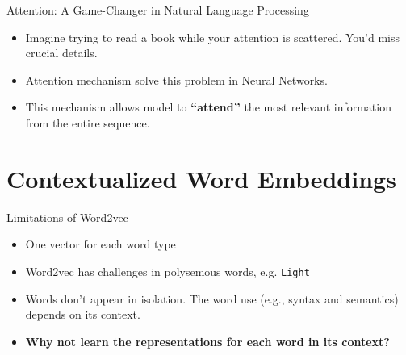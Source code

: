 \documentclass[serif, aspectratio=169]{beamer}
\begin{document}
\begin{frame}{Attention: A Game-Changer in Natural Language Processing}
	\begin{itemize} 
		
		\item Imagine trying to read a book while your attention is scattered. You’d miss crucial details.
		\item Attention mechanism solve this problem in Neural Networks.
		\item This mechanism allows model to \textbf{“attend”} the most relevant information from the entire sequence.
		
	\end{itemize}
\end{frame}

\section{Contextualized Word Embeddings}

\begin{frame}{Limitations of Word2vec}
    \begin{itemize} 
    
        \item One vector for each word type
        
        \item Word2vec has challenges in polysemous words, e.g. \texttt{Light}
        \item Words don’t appear in isolation. The word use (e.g., syntax and semantics) depends on its context.
        
        \item \textbf{Why not learn the representations for each word in its context?}

        \end{itemize}
\end{frame}
\end{document}
